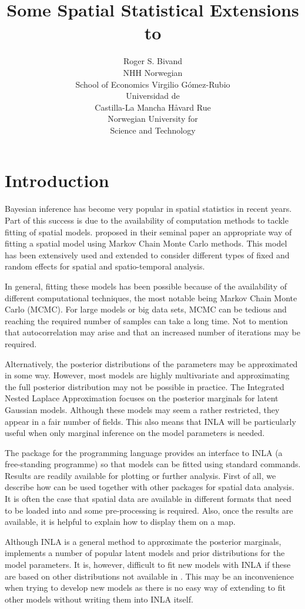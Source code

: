 \documentclass[article]{jss}
\author{Roger S. Bivand\\NHH Norwegian\\ School of Economics \And 
Virgilio G\'omez-Rubio\\Universidad de\\ Castilla-La Mancha 
\And H\r{a}vard Rue\\Norwegian University for\\ Science and Technology
}
\title{Some Spatial Statistical Extensions to \pkg{R-INLA}}
\begin{document}
\section[Introduction]{Introduction}


Bayesian inference has become very popular in spatial statistics in recent
years. Part of this success is due to the availability of computation methods
to tackle fitting of spatial models. \citet{besagetal:1991} proposed in their
seminal paper an appropriate way of fitting a spatial model using Markov Chain
Monte Carlo methods. This model has been extensively used and extended to
consider different types of fixed and random effects for spatial and
spatio-temporal analysis.

In general, fitting these models has been possible because of the availability
of different computational techniques, the most notable being Markov Chain
Monte Carlo (MCMC). For large models or big data sets, MCMC can be tedious and
reaching the required number of samples can take a long time. Not to mention
that autocorrelation may arise and that an increased number of iterations may
be required.

Alternatively, the posterior distributions of the parameters may be
approximated in some way. However, most models are highly multivariate and
approximating the full posterior distribution may not be possible in practice.
The Integrated Nested Laplace Approximation \citep[][INLA]{isi:000264374200002} focuses on
the posterior marginals for latent Gaussian models. Although these models may seem
a rather restricted, they appear in a fair number of fields. 
This also means that INLA will be particularly useful when only
marginal inference on the model parameters is needed.

The  package \citep{rinla:2013} for the  programming
language provides an interface to INLA (a free-standing programme) so that models can be fitted using
standard  commands. Results are readily available for plotting or
further analysis. First of all, we describe how  can be used
together with other  packages for spatial data analysis. It is often
the case that spatial data are available in different formats
that need to be loaded into  and some pre-processing is
required. Also, once the results are available, it is helpful to explain 
how to display them on a map.

Although INLA is a general method to approximate the
posterior marginals,  implements a number of popular latent models and prior
distributions for the model parameters.
It is, however, difficult to fit new models with INLA if these
are based on other distributions not available in .  This may be an
inconvenience when trying to develop new models as there is no easy way of
extending  to fit other models without writing them into INLA itself.
\end{document}
